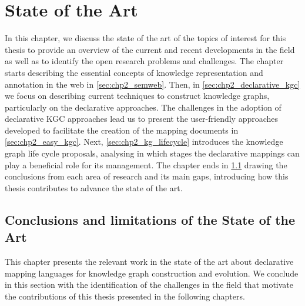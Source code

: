 \chapter{State of the Art}
\label{chapter:sota}

In this chapter, we discuss the state of the art of the topics of interest for this thesis to provide an overview of the current and recent developments in the field as well as to identify the open research problems and challenges. The chapter starts describing the essential concepts of knowledge representation and annotation in the web in \cref{sec:chp2_semweb}. Then, in \cref{sec:chp2_declarative_kgc} we focus on describing current techniques to construct knowledge graphs, particularly on the declarative approaches. The challenges in the adoption of declarative KGC approaches lead us to present the user-friendly approaches developed to facilitate the creation of the mapping documents in \cref{sec:chp2_easy_kgc}. Next, \cref{sec:chp2_kg_lifecycle} introduces the knowledge graph life cycle proposals, analysing in which stages the declarative mappings can play a beneficial role for its management. The chapter ends in \cref{sec:chp2_conclusions-sota} drawing the conclusions from each area of research and its main gaps, introducing how this thesis contributes to advance the state of the art. 










\section{Conclusions and limitations of the State of the Art}
\label{sec:chp2_conclusions-sota}

This chapter presents the relevant work in the state of the art about declarative mapping languages for knowledge graph construction and evolution. We conclude in this section with the identification of the challenges in the field that motivate the contributions of this thesis presented in the following chapters.

